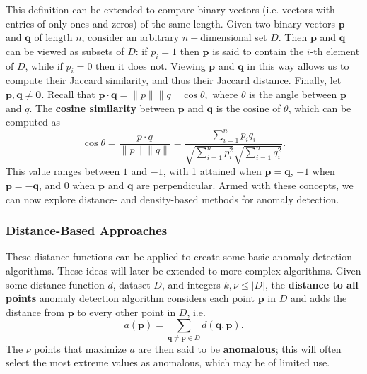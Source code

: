 This definition can be extended to compare binary vectors  (i.e. vectors with entries of only ones and zeros) of the same length.
Given two binary vectors $\mathbf{p}$ and $\mathbf{q}$ of length $n$, consider an arbitrary $n-$dimensional set $D$. Then $\mathbf{p}$ and $\mathbf{q}$ can be viewed as subsets of $D$: if $p_i=1$ then $\mathbf{p}$ is said to contain the $i$-th element of $D$, while if $p_i=0$ then it does not. Viewing $\mathbf{p}$ and $\mathbf{q}$ in this way allows us to compute their Jaccard similarity, and thus their Jaccard distance. \newline\newline
Finally, let $\mathbf{p},\mathbf{q}\neq \mathbf{0}$. Recall that 
$\mathbf{p} \cdot \mathbf{q} 
= \lVert p \rVert \lVert q \rVert \cos\theta,$
where $\theta$ is the angle between $\mathbf{p}$ and $q$.
The \textbf{cosine similarity} between $\mathbf{p}$ and $\mathbf{q}$ is the cosine of $\theta$, which can be computed as
$$
\cos\theta
= \frac{p \cdot q}{\lVert p \rVert \lVert q \rVert}
= \frac{\sum_{i=1}^n p_i q_i}{\sqrt{\sum_{i=1}^n p_i^2} \sqrt{\sum_{i=1}^n q_i^2}}.
$$
This value ranges between $1$ and $-1$, with 1 attained when $\mathbf{p}=\mathbf{q}$, $-1$ when $\mathbf{p}=-\mathbf{q}$, and $0$ when $\mathbf{p}$ and $\mathbf{q}$ are perpendicular.\newline\newline
Armed with these concepts, we can now explore distance- and density-based methods for anomaly detection. 

\subsubsection*{Distance-Based Approaches}

These distance functions can be applied to create some basic anomaly detection algorithms.
These ideas will later be extended to more complex algorithms.
\newline\newline Given some distance function $d$, dataset $D$, and integers $k,\nu\leq |D|$, 
the \textbf{distance to all points} anomaly detection algorithm considers each point $\mathbf{p}$ in $D$ and adds the distance from $\mathbf{p}$ to every other point in $D$, i.e.
$$
a(\mathbf{p}) 
= \sum_{\mathbf{q}\neq \mathbf{p} \in D} d(\mathbf{q}, \mathbf{p}).
$$
The $\nu$ points that maximize $a$ are then said to be \textbf{anomalous}; this will often select the most extreme values as anomalous, which may be of limited use. 

